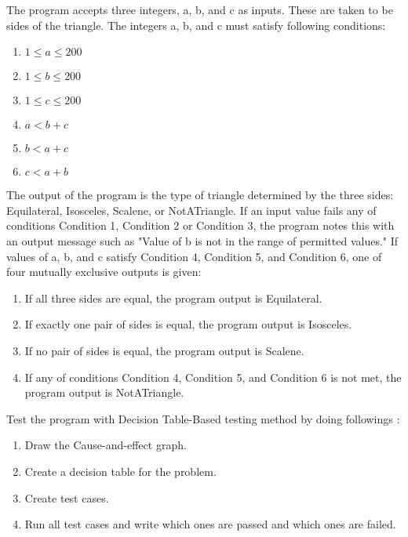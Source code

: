 \begin{exercise}
    The program accepts three integers, a, b, and c as inputs. These are taken to be sides of the triangle. The integers a, b, and c must satisfy following conditions:
    
    \begin{enumerate}[label=\textbf{Condition \arabic*:},left=0pt,noitemsep]
        \item $1 \le a \le 200$
        \item $1 \le b \le 200$
        \item $1 \le c \le 200$
        \item $a < b + c$
        \item $b < a + c$
        \item $c < a + b$
    \end{enumerate}
    
    The output of the program is the type of triangle determined by the three sides: Equilateral, Isosceles, Scalene, or NotATriangle. If an input value fails any of conditions Condition 1, Condition 2 or Condition 3, the program notes this with an output message such as "Value of b is not in the range of permitted values." If values of a, b, and c satisfy Condition 4, Condition 5, and Condition 6, one of four mutually exclusive outputs is given:
    
    \begin{enumerate}[nosep]
        \item If all three sides are equal, the program output is Equilateral.
        \item If exactly one pair of sides is equal, the program output is Isosceles.
        \item If no pair of sides is equal, the program output is Scalene.
        \item If any of conditions Condition 4, Condition 5, and Condition 6 is not met, the program output is NotATriangle.
    \end{enumerate}
    
    Test the program with Decision Table-Based testing method by doing followings \autocite{jorgensen2013software}:
    \begin{enumerate}[label=\alph*),nosep]
        \item Draw the Cause-and-effect graph.
        \item Create a decision table for the problem.
        \item Create test cases.
        \item Run all test cases and write which ones are passed and which ones are failed.
    \end{enumerate}
\end{exercise}

